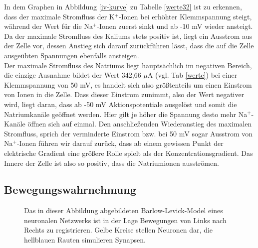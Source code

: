 \documentclass[11pt]{article}
\begin{document}
In dem Graphen in Abbildung \ref{iv-kurve} zu Tabelle \ref{werte32} ist zu erkennen, dass der maximale Stromfluss der K$^+$-Ionen bei erhöhter Klemmspannung steigt, während der Wert für die Na$^+$-Ionen zuerst sinkt und ab -10 mV wieder ansteigt. Da der maximale Stromfluss des Kaliums stets positiv ist, liegt ein Ausstrom aus der Zelle vor, dessen Anstieg sich darauf zurückführen lässt, dass die auf die Zelle ausgeübten Spannungen ebenfalls ansteigen.\\
Der maximale Stromfluss des Natriums liegt hauptsächlich im negativen Bereich, die einzige Ausnahme bildet der Wert 342,66 $\mu$A  (vgl. Tab \ref{werte}) bei einer Klemmspannung von 50 mV, es handelt sich also größtenteils um einen Einstrom von Ionen in die Zelle. Dass dieser Einstrom zunimmt, also der Wert negativer wird, liegt daran, dass ab -50 mV Aktionspotentiale ausgelöst und somit die Natriumkanäle geöffnet werden. Hier gilt je höher die Spannung desto mehr Na$^+$-Kanäle öffnen sich auf einmal. Den anschließenden Wiederanstieg des maximalen Stromfluss, sprich der verminderte Einstrom bzw. bei 50 mV sogar Ausstrom von Na$^+$-Ionen führen wir darauf zurück, dass ab einem gewissen Punkt der elektrische Gradient eine größere Rolle spielt als der Konzentrationsgradient. Das Innere der Zelle ist also so positiv, dass die Natriumionen ausströmen.

\subsection{Bewegungswahrnehmung}
\begin{figure}[H]
\caption{Das in dieser Abbildung abgebildeten Barlow-Levick-Model eines neuronalen Netzwerks ist in der Lage Bewegungen von Links nach Rechts zu registrieren. Gelbe Kreise stellen Neuronen dar, die hellblauen Rauten simulieren Synapsen.}
\label{bar-lev}
\end{figure}
\end{document}
